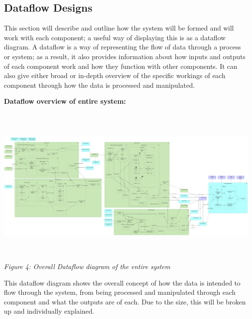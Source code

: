 \documentclass[oneside, 12pt]{article}
\begin{document}
		\subsection{Dataflow Designs}
		This section will describe and outline how the system will be formed and will work with each component; a useful way of displaying this is as a dataflow diagram. A dataflow is a way of representing the flow of data through a process or system; as a result, it also provides information about how inputs and outputs of each component work and how they function with other components. It can also give either broad or in-depth overview of the specific workings of each component through how the data is processed and manipulated.
		\newline
		
		\textbf{Dataflow overview of entire system:}
		\begin{center}
			\includegraphics[width=18cm,height=8cm]{images/Dataflow.png}
			\textit{Figure 4: Overall Dataflow diagram of the entire system}
		\end{center}
		This dataflow diagram shows the overall concept of how the data is intended to flow through the system, from being processed and manipulated through each component and what the outputs are of each. Due to the size, this will be broken up and individually explained.
		\newpage
		
\end{document}

